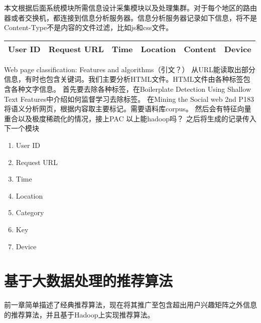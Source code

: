 本文根据后面系统模块所需信息设计采集模块以及处理集群。对于每个地区的路由器或者交换机，都连接到信息分析服务器。信息分析服务器记录如下信息，将不是Content-Type不是内容的文件过滤，比如js和css文件。
\begin{center}
\begin{tabular}{c|c|c|c|c|c}
	\hline
	User ID & Request URL & Time & Location & Content & Device \\
	\hline
\end{tabular}
\end{center}

Web page classification: Features and algorithms（引文？）
从URL能读取出部分信息，有时也包含关键词。我们主要分析HTML文件。HTML文件由各种标签包含各种文字信息。
首先要去除各种标签，在Boilerplate Detection Using Shallow Text Features中介绍如何监督学习去除标签。
在Mining the Social web 2nd P183
将语义分析网页，根据内容取主要标记。需要语料库corpus。
然后会有特征向量重合以及极度稀疏化的情况，接上PAC
以上能hadoop吗？
之后将生成的记录传入下一个模块
\begin{enumerate}
 \item User ID
 \item Request URL
 \item Time
 \item Location
 \item Category
 \item Key
 \item Device
\end{enumerate}

\section{基于大数据处理的推荐算法}
前一章简单描述了经典推荐算法，现在将其推广至包含超出用户兴趣矩阵之外信息的推荐算法，并且基于Hadoop上实现推荐算法。